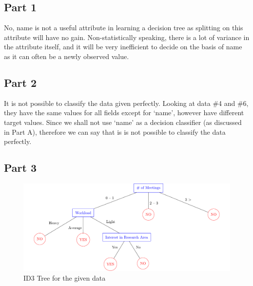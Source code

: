 \documentclass[a4paper,11pt]{article}
\begin{document}
\setlength\parindent{0pt}


\begin{mlsolution}

    \subsection*{Part 1}
    \begin{addmargin}{1.5em}
        No, name is not a useful attribute in learning a decision tree as splitting on this attribute will have no gain. Non-statistically speaking, there is a lot of variance in the attribute itself, and it will be very inefficient to decide on the basis of name as it can often be a newly observed value.
    \end{addmargin}

    \subsection*{Part 2}
    \begin{addmargin}{1.5em}
        It is not possible to classify the data given perfectly. Looking at data \#4 and \#6, they have the same values for all fields except for `name', however have different target values. Since we shall not use `name' as a decision classifier (as discussed in Part A), therefore we can say that is is not possible to classify the data perfectly.
    \end{addmargin}

    \subsection*{Part 3}
    \begin{addmargin}{1.5em}

        \begin{figure}[h!]\label{tree:q1}
            \center%
            \includegraphics{q1-tree.pdf}
            \caption{ID3 Tree for the given data}
        \end{figure}


\end{addmargin}
\end{mlsolution}
\end{document}
